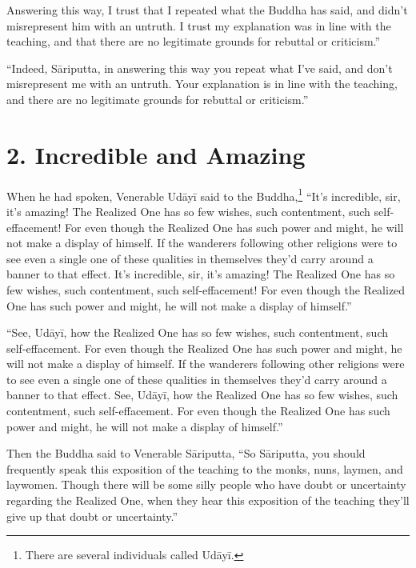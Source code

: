 \documentclass[12pt,openany]{book}%
\begin{document}
Answering this way, I trust that I repeated what the Buddha has said, and didn’t misrepresent him with an untruth. I trust my explanation was in line with the teaching, and that there are no legitimate grounds for rebuttal or criticism.” 

“Indeed, \textsanskrit{Sāriputta}, in answering this way you repeat what I’ve said, and don’t misrepresent me with an untruth. Your explanation is in line with the teaching, and there are no legitimate grounds for rebuttal or criticism.” 

\section*{2. Incredible and Amazing }

When he had spoken, Venerable \textsanskrit{Udāyī} said to the Buddha,\footnote{There are several individuals called \textsanskrit{Udāyī}. } “It’s incredible, sir, it’s amazing! The Realized One has so few wishes, such contentment, such self-effacement! For even though the Realized One has such power and might, he will not make a display of himself. If the wanderers following other religions were to see even a single one of these qualities in themselves they’d carry around a banner to that effect. It’s incredible, sir, it’s amazing! The Realized One has so few wishes, such contentment, such self-effacement! For even though the Realized One has such power and might, he will not make a display of himself.” 

“See, \textsanskrit{Udāyī}, how the Realized One has so few wishes, such contentment, such self-effacement. For even though the Realized One has such power and might, he will not make a display of himself. If the wanderers following other religions were to see even a single one of these qualities in themselves they’d carry around a banner to that effect. See, \textsanskrit{Udāyī}, how the Realized One has so few wishes, such contentment, such self-effacement. For even though the Realized One has such power and might, he will not make a display of himself.” 

Then the Buddha said to Venerable \textsanskrit{Sāriputta}, “So \textsanskrit{Sāriputta}, you should frequently speak this exposition of the teaching to the monks, nuns, laymen, and laywomen. Though there will be some silly people who have doubt or uncertainty regarding the Realized One, when they hear this exposition of the teaching they’ll give up that doubt or uncertainty.” 
\end{document}
